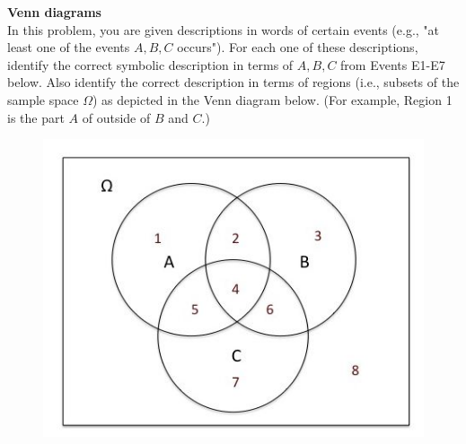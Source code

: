 \documentclass[pdftex, brazil, 12pt, twoside]{article}
\begin{document}
\begin{exercise}
  \textbf{Venn diagrams}\\
  In this problem, you are given descriptions in words of certain events
  (e.g., "at least one of the events $A, B, C$ occurs"). For each one of these
  descriptions, identify the correct symbolic description in terms of $A, B, C$
  from Events E1-E7 below. Also identify the correct description in terms of
  regions (i.e., subsets of the sample space $\Omega$) as depicted in the Venn
  diagram below. (For example, Region 1 is the part $A$ of outside of $B$ and $C$.)

  \begin{figure}[H]
    \begin{center}
      \includegraphics[scale=0.6]{imagens/unit-1/ps-001.jpg}%
    \end{center}
  \end{figure}

  \begin{figure}[H]
    \begin{center}
    \end{center}
  \end{figure}


\end{exercise}
\end{document}
